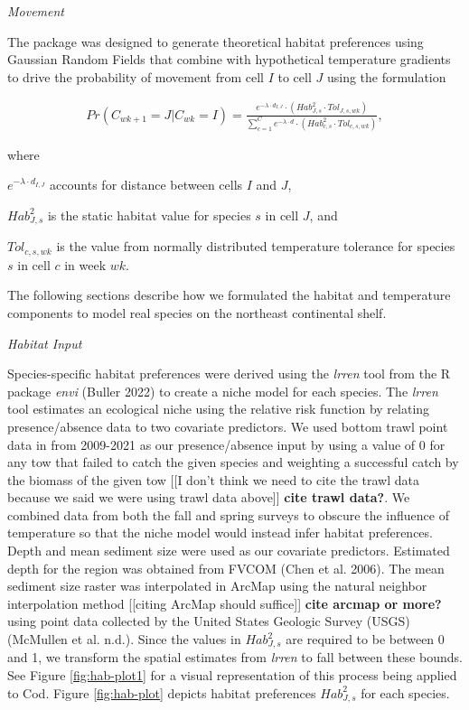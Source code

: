 \documentclass[
  12pt,
]{article}
\begin{document}
\emph{Movement}

The package was designed to generate theoretical habitat preferences using Gaussian Random Fields that combine with hypothetical temperature gradients to drive the probability of movement from cell \(I\) to cell \(J\) using the formulation

\begin{align}
Pr(C_{wk+1}=J|C_{wk}=I) = \frac{e^{-\lambda \cdot d_{I,J}}\cdot(Hab^2_{J,s} \cdot Tol_{J,s,wk})}{\sum^C_{c=1}e^{-\lambda \cdot d} \cdot (Hab^2_{c,s} \cdot Tol_{c,s,wk})},
\label{moveP}
\end{align}

where

\(e^{-\lambda \cdot d_{I,J}}\) accounts for distance between cells \(I\) and \(J\),

\(Hab^2_{J,s}\) is the static habitat value for species \(s\) in cell \(J\), and

\(Tol_{c,s,wk}\) is the value from normally distributed temperature tolerance for species \(s\) in cell \(c\) in week \(wk\).

The following sections describe how we formulated the habitat and temperature components to model real species on the northeast continental shelf.

\emph{Habitat Input}

Species-specific habitat preferences were derived using the \emph{lrren} tool from the R package \emph{envi} (Buller 2022) to create a niche model for each species. The \emph{lrren} tool estimates an ecological niche using the relative risk function by relating presence/absence data to two covariate predictors. We used bottom trawl point data in from 2009-2021 as our presence/absence input by using a value of 0 for any tow that failed to catch the given species and weighting a successful catch by the biomass of the given tow {[}{[}I don't think we need to cite the trawl data because we said we were using trawl data above{]}{]} \textbf{cite trawl data?}. We combined data from both the fall and spring surveys to obscure the influence of temperature so that the niche model would instead infer habitat preferences. Depth and mean sediment size were used as our covariate predictors. Estimated depth for the region was obtained from FVCOM (Chen et al. 2006). The mean sediment size raster was interpolated in ArcMap using the natural neighbor interpolation method {[}{[}citing ArcMap should suffice{]}{]} \textbf{cite arcmap or more?} using point data collected by the United States Geologic Survey (USGS) (McMullen et al. n.d.). Since the values in \(Hab^2_{J,s}\) are required to be between 0 and 1, we transform the spatial estimates from \emph{lrren} to fall between these bounds. See Figure \ref{fig:hab-plot1} for a visual representation of this process being applied to Cod. Figure \ref{fig:hab-plot} depicts habitat preferences \(Hab^2_{J,s}\) for each species.
\end{document}
